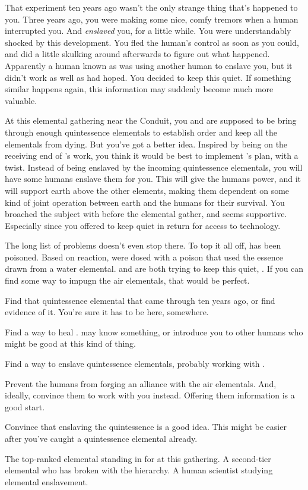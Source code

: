 \documentclass[char]{elementals}
\begin{document}
That experiment ten years ago wasn't the only strange thing that's happened to you.  Three years ago, you were making some nice, comfy tremors when a human interrupted you.  And {\em enslaved} you, for a little while.  You were understandably shocked by this development.  You fled the human's control as soon as you could, and did a little skulking around afterwards to figure out what happened.  Apparently a human known as \cMS{\intro} was using another human to enslave you, but it didn't work as well as \cMS{\they} had hoped.  You decided to keep this quiet.  If something similar happens again, this information may suddenly become much more valuable.

At this elemental gathering near the Conduit, you and \cLoyal{} are supposed to be bring through enough quintessence elementals to establish order and keep all the elementals from dying.  But you've got a better idea.  Inspired by being on the receiving end of \cMS{}'s work, you think it would be best to implement \cLoyal{}'s plan, with a twist.  Instead of being enslaved by the incoming quintessence elementals, you will have some humans enslave them for you.  This will give the humans power, and it will support earth above the other elements, making them dependent on some kind of joint operation between earth and the humans for their survival.  You broached the subject with \cMS{} before the elemental gather, and \cMS{\they} seems supportive.  Especially since you offered to keep quiet in return for access to \cMS{\their} technology.

The long list of problems doesn't even stop there.  To top it all off, \cEarthKing{} has been poisoned.  Based on \cEarthKing{\their} reaction, \cEarthKing{\they} were dosed with a poison that used the essence drawn from a water elemental.  \cLoyal{} and \cRogue{} are both trying to keep this quiet, .  If you can find some way to impugn the air elementals, that would be perfect.

\begin{itemz}[Goals]
	\item Find that quintessence elemental that came through ten years ago, or find evidence of it.  You're sure it has to be here, somewhere.
	\item Find a way to heal \cEarthKing{}.  \cMS{} may know something, or introduce you to other humans who might be good at this kind of thing.
	\item Find a way to enslave quintessence elementals, probably working with \cMS{}.
	\item Prevent the humans from forging an alliance with the air elementals.  And, ideally, convince them to work with you instead.  Offering them information is a good start.
	\item Convince \cLoyal{} that enslaving the quintessence is a good idea.  This might be easier after you've caught a quintessence elemental already.
\end{itemz}

\begin{contacts}
	\contact{\cLoyal{}}  The top-ranked elemental standing in for \cEarthKing{} at this gathering.
	\contact{\cRogue{}}  A second-tier elemental who has broken with the hierarchy.
	\contact{\cMS{}}  A human scientist studying elemental enslavement.
\end{contacts}
\end{document}
